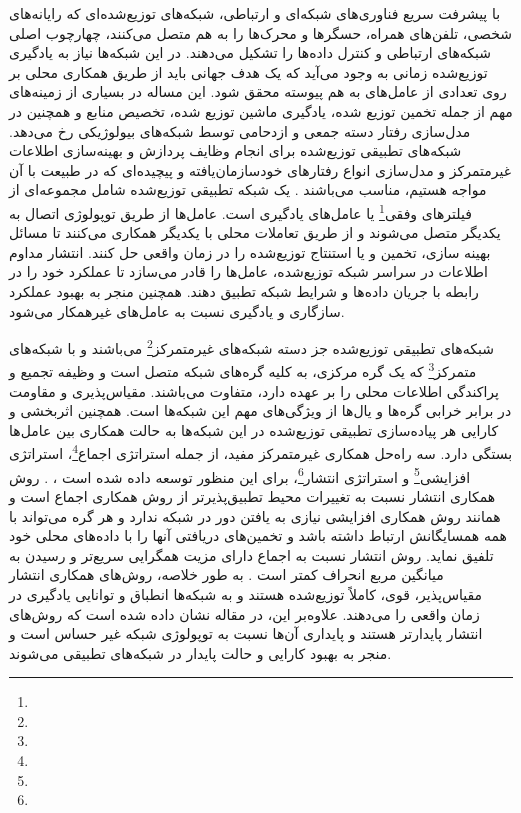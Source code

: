 با پیشرفت سریع فناوری‌های شبکه‌ای و ارتباطی، شبکه‌های توزیع‌شده‌ای که رایانه‌های شخصی، تلفن‌های همراه، حسگرها و محرک‌ها را به هم متصل می‌کنند، چهارچوب اصلی شبکه‌های ارتباطی و کنترل داده‌ها را تشکیل می‌دهند. در این شبکه‌ها نیاز به یادگیری توزیع‌شده زمانی به وجود می‌آید که یک هدف جهانی باید از طریق همکاری محلی بر روی تعدادی از عامل‌های به هم پیوسته محقق شود. این مساله در بسیاری از زمینه‌های مهم از جمله تخمین توزیع شده، یادگیری ماشین توزیع شده، تخصیص منابع و همچنین در مدل‌سازی رفتار دسته جمعی و ازدحامی توسط شبکه‌های بیولوژیکی رخ می‌دهد. شبکه‌های تطبیقی توزیع‌شده برای انجام وظایف پردازش و بهینه‌سازی اطلاعات غیرمتمرکز و مدل‌سازی انواع رفتارهای خودسازمان‌یافته و پیچیده‌ای که در طبیعت با آن مواجه هستیم، مناسب می‌باشند \cite{Zhao2014}. یک شبکه‌ تطبیقی توزیع‌شده شامل مجموعه‌ای از فیلترهای وفقی\footnote{} یا عامل‌های یادگیری است. عامل‌ها از طریق توپولوژی اتصال به یکدیگر متصل می‌شوند و از طریق تعاملات محلی با یکدیگر همکاری می‌کنند تا مسائل بهینه سازی، تخمین و یا استنتاج توزیع‌شده را در زمان واقعی حل کنند. انتشار مداوم اطلاعات در سراسر شبکه توزیع‌شده، عامل‌ها را قادر می‌سازد تا عملکرد خود را در رابطه با جریان داده‌ها و شرایط شبکه تطبیق دهند. همچنین منجر به بهبود عملکرد سازگاری و یادگیری نسبت به عامل‌های غیرهمکار می‌شود. 

شبکه‌های تطبیقی توزیع‌شده جز دسته شبکه‌های غیرمتمرکز\footnote{} می‌باشند و  با شبکه‌های متمرکز\footnote{} که یک گره مرکزی، به کلیه گره‌های شبکه متصل است و وظیفه تجمیع و پراکندگی اطلاعات محلی را بر عهده دارد، متفاوت می‌باشند. مقیاس‌پذیری و مقاومت در برابر خرابی گره‌ها و یال‌ها از ویژگی‌های مهم این شبکه‌ها است. همچنین اثربخشی و کارایی هر پیاده‌سازی تطبیقی توزیع‌شده در این شبکه‌ها به حالت همکاری بین عامل‌ها بستگی دارد. سه راه‌حل همکاری غیرمتمرکز مفید، از جمله استراتژی‌ اجماع\footnote{}، استراتژی افزایشی\footnote{} و استراتژی‌ انتشار\footnote{}، برای این منظور توسعه داده شده است \cite{Sayed2013} ، \cite{SayedBook}. روش همکاری انتشار نسبت به تغییرات محیط تطبیق‌پذیرتر از روش همکاری اجماع است و همانند روش همکاری افزایشی نیازی به یافتن دور در شبکه ندارد و هر گره می‌تواند با همه همسایگانش ارتباط داشته باشد و تخمین‌های دریافتی آنها را با داده‌های محلی خود تلفیق نماید. روش انتشار نسبت به اجماع دارای مزیت همگرایی سریع‌تر و رسیدن به میانگین مربع انحراف کمتر است \cite{Sayed2013,Sayed2014}. به طور خلاصه، روش‌های همکاری انتشار مقیاس‌پذیر، قوی، کاملاً توزیع‌شده هستند و به شبکه‌ها انطباق و توانایی یادگیری در زمان واقعی را می‌دهند. علاوه‌بر این، در مقاله \cite{Sayed2012} نشان داده شده است که روش‌های انتشار پایدارتر هستند و پایداری آن‌ها نسبت به توپولوژی شبکه غیر حساس است و منجر به بهبود کارایی و حالت پایدار در شبکه‌های تطبیقی می‌شوند.


